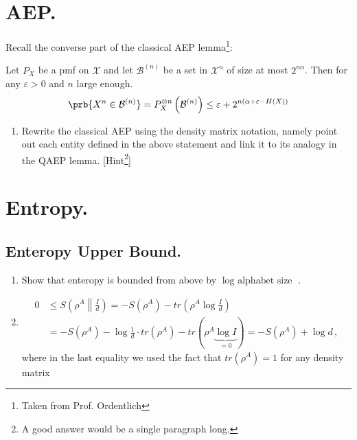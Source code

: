\documentclass[12pt,a4paper]{article}
\begin{document}
\section{AEP.}
Recall the converse part of the classical AEP lemma\footnote{Taken from Prof. Ordentlich}:
\begin{lemma}
  Let $P_X$ be a pmf on $\mathcal{X}$ and let $\mathcal{B}^{(n)}$ be a set in $\mathcal{X}^n$ of size at most $2^{n\alpha}$. Then for any $\varepsilon > 0$ and $n$ large enough. 
  \begin{equation*}
    \begin{split}
      \prb{X^n \in \mathcal{B}^{(n)}} = P^{\otimes n}_{X}\left( \mathcal{B}^{(n)} \right) \le \varepsilon + 2^{n(\alpha + \varepsilon - H(X))}
    \end{split}
  \end{equation*}
\end{lemma}
\begin{enumerate} 
  \item Rewrite the classical AEP using the density matrix notation, namely point out each entity defined in the above statement and link it to its analogy in the QAEP lemma. [Hint\footnote{A good answer would be a single paragraph long.}]
\end{enumerate}


\section{Entropy.}

\subsection{Enteropy Upper Bound. } 
\begin{enumerate}
  \item Show that enteropy is bounded from above by $\log \text{ alphabet size } $. 
  \item   \begin{align*}
        0 &\leq S \left( \rho^A \middle\| \frac{I}{d} \right) = - S(\rho^A) - tr \left( \rho^A \log \frac{I}{d} \right) \\
        &= -S(\rho^A) - \log\frac{1}{d} \cdot tr(\rho^A) - tr(\rho^A \underbrace{\log I}_{=0})
        = -S(\rho^A) + \log d \,,
    \end{align*}
    where in the last equality we used the fact that $tr(\rho^A) = 1$ for any density matrix
\end{enumerate}
\end{document}

